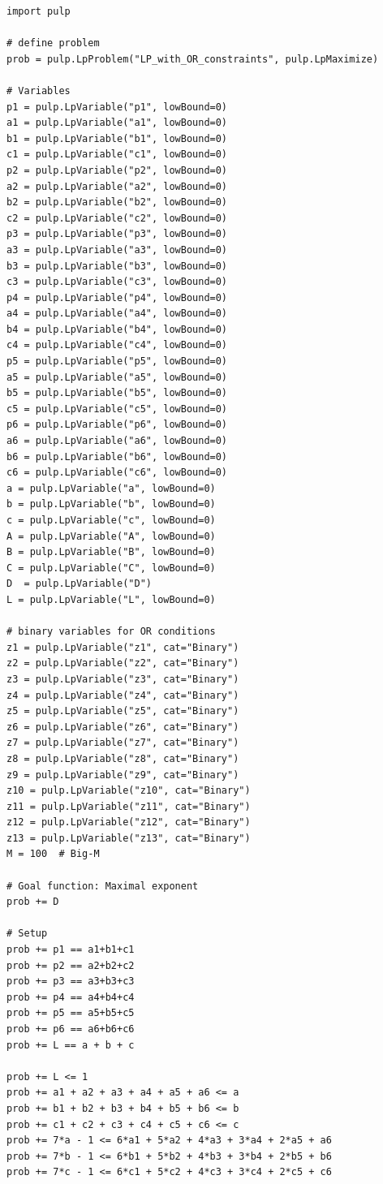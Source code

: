 \documentclass[a4paper,11pt,twoside,reqno]{amsart}
\theoremstyle{plain}
\theoremstyle{remark}
\numberwithin{prop}{section}
\numberwithin{equation}{section}
\begin{document}
\begin{lstlisting}[style=mypython]
import pulp

# define problem
prob = pulp.LpProblem("LP_with_OR_constraints", pulp.LpMaximize)

# Variables
p1 = pulp.LpVariable("p1", lowBound=0)
a1 = pulp.LpVariable("a1", lowBound=0)
b1 = pulp.LpVariable("b1", lowBound=0)
c1 = pulp.LpVariable("c1", lowBound=0)
p2 = pulp.LpVariable("p2", lowBound=0)
a2 = pulp.LpVariable("a2", lowBound=0)
b2 = pulp.LpVariable("b2", lowBound=0)
c2 = pulp.LpVariable("c2", lowBound=0)
p3 = pulp.LpVariable("p3", lowBound=0)
a3 = pulp.LpVariable("a3", lowBound=0)
b3 = pulp.LpVariable("b3", lowBound=0)
c3 = pulp.LpVariable("c3", lowBound=0)
p4 = pulp.LpVariable("p4", lowBound=0)
a4 = pulp.LpVariable("a4", lowBound=0)
b4 = pulp.LpVariable("b4", lowBound=0)
c4 = pulp.LpVariable("c4", lowBound=0)
p5 = pulp.LpVariable("p5", lowBound=0)
a5 = pulp.LpVariable("a5", lowBound=0)
b5 = pulp.LpVariable("b5", lowBound=0)
c5 = pulp.LpVariable("c5", lowBound=0)
p6 = pulp.LpVariable("p6", lowBound=0)
a6 = pulp.LpVariable("a6", lowBound=0)
b6 = pulp.LpVariable("b6", lowBound=0)
c6 = pulp.LpVariable("c6", lowBound=0)
a = pulp.LpVariable("a", lowBound=0)
b = pulp.LpVariable("b", lowBound=0)
c = pulp.LpVariable("c", lowBound=0)
A = pulp.LpVariable("A", lowBound=0)
B = pulp.LpVariable("B", lowBound=0)
C = pulp.LpVariable("C", lowBound=0)
D  = pulp.LpVariable("D")
L = pulp.LpVariable("L", lowBound=0)

# binary variables for OR conditions
z1 = pulp.LpVariable("z1", cat="Binary")
z2 = pulp.LpVariable("z2", cat="Binary")
z3 = pulp.LpVariable("z3", cat="Binary")
z4 = pulp.LpVariable("z4", cat="Binary")
z5 = pulp.LpVariable("z5", cat="Binary")
z6 = pulp.LpVariable("z6", cat="Binary")
z7 = pulp.LpVariable("z7", cat="Binary")
z8 = pulp.LpVariable("z8", cat="Binary")
z9 = pulp.LpVariable("z9", cat="Binary")
z10 = pulp.LpVariable("z10", cat="Binary")
z11 = pulp.LpVariable("z11", cat="Binary")
z12 = pulp.LpVariable("z12", cat="Binary")
z13 = pulp.LpVariable("z13", cat="Binary")
M = 100  # Big-M

# Goal function: Maximal exponent
prob += D

# Setup
prob += p1 == a1+b1+c1
prob += p2 == a2+b2+c2
prob += p3 == a3+b3+c3
prob += p4 == a4+b4+c4
prob += p5 == a5+b5+c5
prob += p6 == a6+b6+c6
prob += L == a + b + c

prob += L <= 1
prob += a1 + a2 + a3 + a4 + a5 + a6 <= a
prob += b1 + b2 + b3 + b4 + b5 + b6 <= b
prob += c1 + c2 + c3 + c4 + c5 + c6 <= c
prob += 7*a - 1 <= 6*a1 + 5*a2 + 4*a3 + 3*a4 + 2*a5 + a6
prob += 7*b - 1 <= 6*b1 + 5*b2 + 4*b3 + 3*b4 + 2*b5 + b6
prob += 7*c - 1 <= 6*c1 + 5*c2 + 4*c3 + 3*c4 + 2*c5 + c6


\end{lstlisting}
\end{document}
